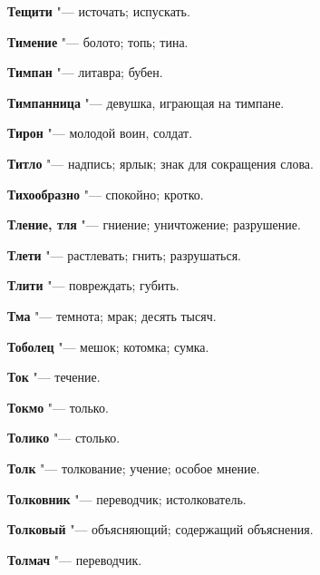 \begin{mymulticols}{2}
\noindent\textbf{Тещити} "--- источать; испускать. 




\noindent\textbf{Тимение} "--- болото; топь; тина. 




\noindent\textbf{Тимпан} "--- литавра; бубен. 




\noindent\textbf{Тимпанница} "--- девушка, играющая на тимпане. 




\noindent\textbf{Тирон} "--- молодой воин, солдат. 




\noindent\textbf{Титло} "--- надпись; ярлык; знак для сокращения слова. 




\noindent\textbf{Тихообразно} "--- спокойно; кротко. 




\noindent\textbf{Тление, тля} "--- гниение; уничтожение; разрушение. 




\noindent\textbf{Тлети} "--- растлевать; гнить; разрушаться. 




\noindent\textbf{Тлити} "--- повреждать; губить. 




\noindent\textbf{Тма} "--- темнота; мрак; десять тысяч. 




\noindent\textbf{Тоболец} "--- мешок; котомка; сумка. 




\noindent\textbf{Ток} "--- течение. 




\noindent\textbf{Токмо} "--- только. 




\noindent\textbf{Толико} "--- столько. 




\noindent\textbf{Толк} "--- толкование; учение; особое мнение. 




\noindent\textbf{Толковник} "--- переводчик; истолкователь. 




\noindent\textbf{Толковый} "--- объясняющий; содержащий объяснения. 




\noindent\textbf{Толмач} "--- переводчик. 





\end{mymulticols}

